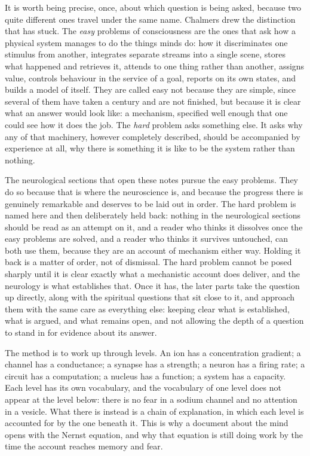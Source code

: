 \documentclass[11pt]{article}
\begin{document}
It is worth being precise, once, about which question is being asked, because two quite different ones travel under the same name. Chalmers drew the distinction that has stuck. The \textit{easy} problems of consciousness are the ones that ask how a physical system manages to do the things minds do: how it discriminates one stimulus from another, integrates separate streams into a single scene, stores what happened and retrieves it, attends to one thing rather than another, assigns value, controls behaviour in the service of a goal, reports on its own states, and builds a model of itself. They are called easy not because they are simple, since several of them have taken a century and are not finished, but because it is clear what an answer would look like: a mechanism, specified well enough that one could see how it does the job. The \textit{hard} problem asks something else. It asks why any of that machinery, however completely described, should be accompanied by experience at all, why there is something it is like to be the system rather than nothing.

The neurological sections that open these notes pursue the easy problems. They do so because that is where the neuroscience is, and because the progress there is genuinely remarkable and deserves to be laid out in order. The hard problem is named here and then deliberately held back: nothing in the neurological sections should be read as an attempt on it, and a reader who thinks it dissolves once the easy problems are solved, and a reader who thinks it survives untouched, can both use them, because they are an account of mechanism either way. Holding it back is a matter of order, not of dismissal. The hard problem cannot be posed sharply until it is clear exactly what a mechanistic account does deliver, and the neurology is what establishes that. Once it has, the later parts take the question up directly, along with the spiritual questions that sit close to it, and approach them with the same care as everything else: keeping clear what is established, what is argued, and what remains open, and not allowing the depth of a question to stand in for evidence about its answer.

The method is to work up through levels. An ion has a concentration gradient; a channel has a conductance; a synapse has a strength; a neuron has a firing rate; a circuit has a computation; a nucleus has a function; a system has a capacity. Each level has its own vocabulary, and the vocabulary of one level does not appear at the level below: there is no fear in a sodium channel and no attention in a vesicle. What there is instead is a chain of explanation, in which each level is accounted for by the one beneath it. This is why a document about the mind opens with the Nernst equation, and why that equation is still doing work by the time the account reaches memory and fear.
\end{document}
